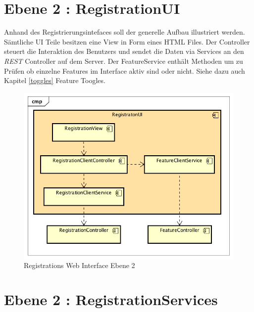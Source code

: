 \section{Ebene 2 : RegistrationUI}
Anhand des Registrierungsintefaces soll der generelle Aufbau illustriert werden. Sämtliche UI Teile besitzen eine View in Form eines HTML Files. Der Controller steuert die Interaktion des Benutzers und sendet die Daten via Services an den \textit{\gls{REST}} Controller auf dem Server. Der FeatureService enthält Methoden um zu Prüfen ob einzelne Features im Interface aktiv sind oder nicht. Siehe dazu auch Kapitel \ref{toggles} Feature Toogles.

\begin{figure}[H]
	\centering
	\includegraphics[scale=0.8]{WebComponentLevel2.png}
	\caption{Registrations Web Interface Ebene 2}
\end{figure}
\newpage
\section{Ebene 2 : RegistrationServices}
\label{reg-service}

